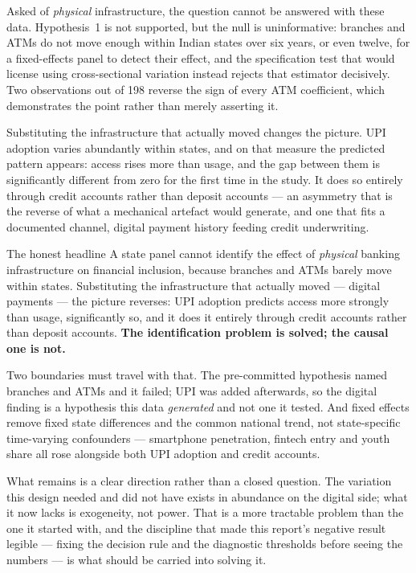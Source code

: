 Asked of \emph{physical} infrastructure, the question cannot be answered with these data.
Hypothesis~1 is not supported, but the null is uninformative: branches and ATMs do not move enough
within Indian states over six years, or even twelve, for a fixed-effects panel to detect their
effect, and the specification test that would license using cross-sectional variation instead
rejects that estimator decisively. Two observations out of 198 reverse the sign of every ATM
coefficient, which demonstrates the point rather than merely asserting it.

Substituting the infrastructure that actually moved changes the picture. UPI adoption varies
abundantly within states, and on that measure the predicted pattern appears: access rises more than
usage, and the gap between them is significantly different from zero for the first time in the
study. It does so entirely through credit accounts rather than deposit accounts --- an asymmetry
that is the reverse of what a mechanical artefact would generate, and one that fits a documented
channel, digital payment history feeding credit underwriting.

\begin{keybox}{The honest headline}
A state panel cannot identify the effect of \emph{physical} banking infrastructure on financial
inclusion, because branches and ATMs barely move within states. Substituting the infrastructure
that actually moved --- digital payments --- the picture reverses: UPI adoption predicts access
more strongly than usage, significantly so, and it does it entirely through credit accounts rather
than deposit accounts. \textbf{The identification problem is solved; the causal one is not.}
\end{keybox}

\noindent
Two boundaries must travel with that. The pre-committed hypothesis named branches and ATMs and it
failed; UPI was added afterwards, so the digital finding is a hypothesis this data \emph{generated}
and not one it tested. And fixed effects remove fixed state differences and the common national
trend, not state-specific time-varying confounders --- smartphone penetration, fintech entry and
youth share all rose alongside both UPI adoption and credit accounts.

What remains is a clear direction rather than a closed question. The variation this design needed
and did not have exists in abundance on the digital side; what it now lacks is exogeneity, not
power. That is a more tractable problem than the one it started with, and the discipline that made
this report's negative result legible --- fixing the decision rule and the diagnostic thresholds
before seeing the numbers --- is what should be carried into solving it.
